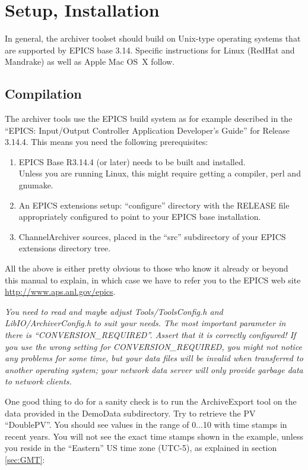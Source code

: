 \chapter{Setup, Installation} \label{sec:install}
In general, the archiver toolset should build on Unix-type operating
systems that are supported by EPICS base 3.14.
Specific instructions for Linux (RedHat and Mandrake) as well as Apple
Mac OS~X follow.

\section{Compilation}
The archiver tools use the EPICS build system as for example described
in the ``EPICS: Input/Output Controller Application Developer's
Guide'' for Release 3.14.4.  This means you need the following
prerequisites:
\begin{enumerate}
\item EPICS Base R3.14.4 (or later) needs to be built and installed.\\
      Unless you are running Linux, this might require getting a
      compiler, perl and gnumake.
\item An EPICS extensions setup: ``configure'' directory with the RELEASE
      file appropriately configured to point to your EPICS base installation.
\item ChannelArchiver sources, placed in the ``src'' subdirectory of
      your EPICS extensions directory tree. 
\end{enumerate}

\noindent All the above is either pretty obvious to those who know it
already or beyond this manual to explain, in which case we have to
refer you to the EPICS web site
\href{http://www.aps.anl.gov/epics}{http://www.aps.anl.gov/epics}. 

\medskip

\emph{You need to read and maybe adjust Tools/ToolsConfig.h and
LibIO/ArchiverConfig.h to suit your needs. The most important
parameter in there is ``CONVERSION\_REQUIRED''. Assert that it is
correctly configured! If you use the wrong setting for
CONVERSION\_REQUIRED, you might not notice any problems for some time,
but your data files will be invalid when transferred to another
operating system; your network data server will only provide garbage
data to network clients. 
}

One good thing to do for a sanity check is to run the ArchiveExport
tool on the data provided in the DemoData subdirectory. Try to
retrieve the PV ``DoublePV''. You should see values in the range of
0...10 with time stamps in recent years.  You will not see the exact
time stamps shown in the example, unless you reside in the
``Eastern'' US time zone (UTC-5), as explained in section
\ref{sec:GMT}:

